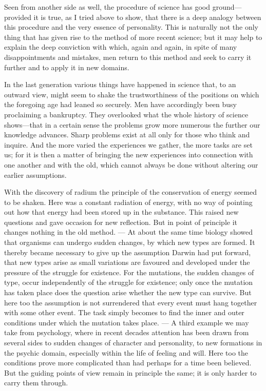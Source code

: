 \documentclass[12pt,a4paper]{article}
\newcommand{\opage}[1]{\marginnote{\footnotesize\textit{[#1]}}}
\begin{document}
Seen from another side as well, the procedure of science has good ground---provided
it is true, as I tried above to show, that there is a deep analogy between this
procedure and the very essence of personality. This is naturally not the only thing
that has given rise to the method of more recent science; but it may help to explain
the deep conviction with which, again and again, in spite of many disappointments
and \opage{25}mistakes, men return to this method and seek to carry it further and to apply it
in new domains.

In the last generation various things have happened in science that, to an outward
view, might seem to shake the trustworthiness of the positions on which the
foregoing age had leaned so securely. Men have accordingly been busy proclaiming a
bankruptcy. They overlooked what the whole history of science shows---that in a
certain sense the problems grow more numerous the further our knowledge advances.
Sharp problems exist at all only for those who think and inquire. And the more
varied the experiences we gather, the more tasks are set us; for it is then a
matter of bringing the new experiences into connection with one another and with
the old, which cannot always be done without altering our earlier assumptions.

With the discovery of radium the principle of the conservation of energy seemed to
be shaken. Here was a constant radiation of energy, with no way of pointing out how
that energy had been stored up in the substance. This raised new questions and gave
occasion for new reflection. But in point of principle it changes nothing in the
old method. --- At about the same time biology showed that organisms can undergo
sudden changes, by which new types are formed. It thereby became necessary to give
up the assumption Darwin had put forward, that new types arise as small variations
are favoured and developed under the pressure of the struggle for existence. For
the mutations, the sudden changes of type, occur independently of the struggle for
existence; only once the mutation has taken place does the question arise whether
the new type can survive. But here too the assumption is not surrendered that every
event must hang together with some other event. The task simply becomes to find the
inner and outer \opage{26}conditions under which the mutation takes place. --- A third example
we may take from psychology, where in recent decades attention has been drawn from
several sides to sudden changes of character and personality, to new formations in
the psychic domain, especially within the life of feeling and will. Here too the
conditions prove more complicated than had perhaps for a time been believed. But
the guiding points of view remain in principle the same; it is only harder to carry
them through.
\end{document}
